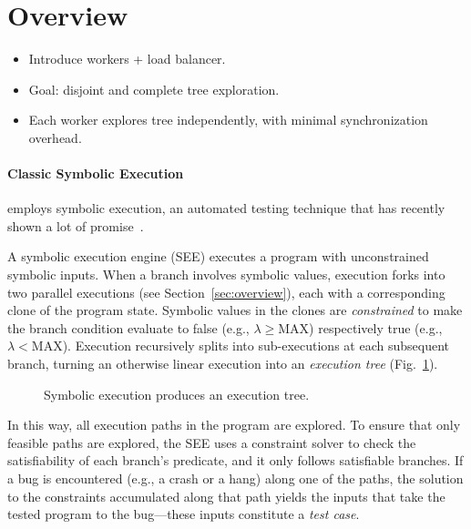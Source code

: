 
\section{Overview}
\label{sec:concept}

\begin{itemize}
\item Introduce workers + load balancer.
\item Goal: disjoint and complete tree exploration.
\item Each worker explores tree independently, with minimal synchronization overhead.
\end{itemize}

\paragraph{Classic Symbolic Execution}

\cnine employs symbolic execution, an automated testing technique that has recently shown a lot of
promise~\cite{dart,klee}. 

A symbolic execution engine (SEE) executes a program with unconstrained symbolic inputs.  When a branch involves symbolic values, execution forks into two parallel executions (see Section~\ref{sec:overview}), each with a corresponding clone of the program state.  Symbolic values in the clones are {\em constrained} to make the branch condition evaluate to false (e.g., $\lambda\!\ge${\small MAX}) respectively true (e.g., $\lambda\!<${\small MAX}). Execution recursively splits into sub-executions at each subsequent branch, turning an otherwise linear execution into an {\em execution tree} (Fig.~\ref{fig:exectree}). 

\begin{figure}[h!]
  \centering
  \vspace{-10mm}
  \caption{Symbolic execution produces an execution tree.}
  \label{fig:exectree}
  \vspace{-2mm}
\end{figure}

In this way, all execution paths in the program are explored.  To ensure that only feasible paths are explored, the SEE uses a constraint solver to check the satisfiability of each branch's predicate, and it only follows satisfiable branches.  If a bug is encountered (e.g., a crash or a hang) along one of the paths, the solution to the constraints accumulated along that path yields the inputs that take the tested program to the bug---these inputs constitute a {\em test case}.

